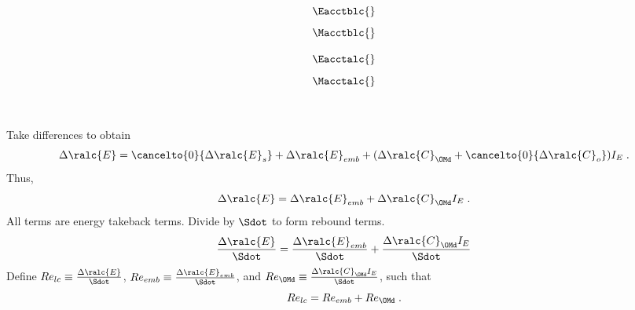 

\begin{landscape}

\linespread{1}


\sectionsep{}

{
  \begin{equation}
  \Eacctblc{}
  \end{equation}
}
{
  \begin{equation}
  \Macctblc{}
  \end{equation}
}

\sectionsep{}

{
  \begin{equation}
  \Eacctalc{}
  \end{equation}
}
{
  \begin{equation}
  \Macctalc{}
  \end{equation}
}

\sectionsep{}

\derivsection{}
{
    ~
    
    Take differences to obtain
  \begin{equation}
  \Delta \ralc{E} = \cancelto{0}{\Delta \ralc{E}_s}
  + \Delta \ralc{E}_{emb}
  + (\Delta \ralc{C}_{\OMd} + \cancelto{0}{\Delta \ralc{C}_o}) I_E \; .
  \end{equation}
  Thus, 
  \begin{equation}
  \Delta \ralc{E} = \Delta \ralc{E}_{emb} + \Delta \ralc{C}_{\OMd} I_E \; .
  \end{equation}
  All terms are energy takeback terms.
  Divide by $\Sdot$ to form rebound terms.
  \begin{equation}
  \frac{\Delta \ralc{E}}{\Sdot} = \frac{\Delta \ralc{E}_{emb}}{\Sdot} + \frac{\Delta \ralc{C}_{\OMd} I_E}{\Sdot}
  \end{equation}
  Define
  $Re_{lc} \equiv \frac{\Delta \ralc{E}}{\Sdot}$, 
  $Re_{emb} \equiv \frac{\Delta \ralc{E}_{emb}}{\Sdot}$, and
  $Re_{\OMd} \equiv \frac{\Delta \ralc{C}_{\OMd} I_E}{\Sdot}$,
  such that
  \begin{equation}
  Re_{lc} = Re_{emb} + Re_{\OMd} \; .
  \end{equation}
}
{
    ~
    
}
\end{landscape}
